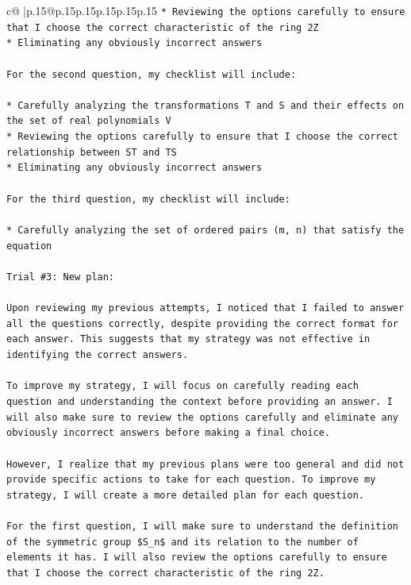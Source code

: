 \documentclass{article}
\begin{document}
{\begin{supertabular}{c@{$\;$}|p{.15\linewidth}@{}p{.15\linewidth}p{.15\linewidth}p{.15\linewidth}p{.15\linewidth}p{.15\linewidth}}
{{{\texttt{* Reviewing the options carefully to ensure that I choose the correct characteristic of the ring 2Z} \\
\texttt{* Eliminating any obviously incorrect answers} \\
\\ 
\texttt{For the second question, my checklist will include:} \\
\\ 
\texttt{* Carefully analyzing the transformations T and S and their effects on the set of real polynomials V} \\
\texttt{* Reviewing the options carefully to ensure that I choose the correct relationship between ST and TS} \\
\texttt{* Eliminating any obviously incorrect answers} \\
\\ 
\texttt{For the third question, my checklist will include:} \\
\\ 
\texttt{* Carefully analyzing the set of ordered pairs (m, n) that satisfy the equation} \\
\\ 
\texttt{Trial \#3: New plan: } \\
\\ 
\texttt{Upon reviewing my previous attempts, I noticed that I failed to answer all the questions correctly, despite providing the correct format for each answer. This suggests that my strategy was not effective in identifying the correct answers.} \\
\\ 
\texttt{To improve my strategy, I will focus on carefully reading each question and understanding the context before providing an answer. I will also make sure to review the options carefully and eliminate any obviously incorrect answers before making a final choice.} \\
\\ 
\texttt{However, I realize that my previous plans were too general and did not provide specific actions to take for each question. To improve my strategy, I will create a more detailed plan for each question.} \\
\\ 
\texttt{For the first question, I will make sure to understand the definition of the symmetric group \$S\_n\$ and its relation to the number of elements it has. I will also review the options carefully to ensure that I choose the correct characteristic of the ring 2Z.} \\
}}}
\end{supertabular}}
\end{document}
